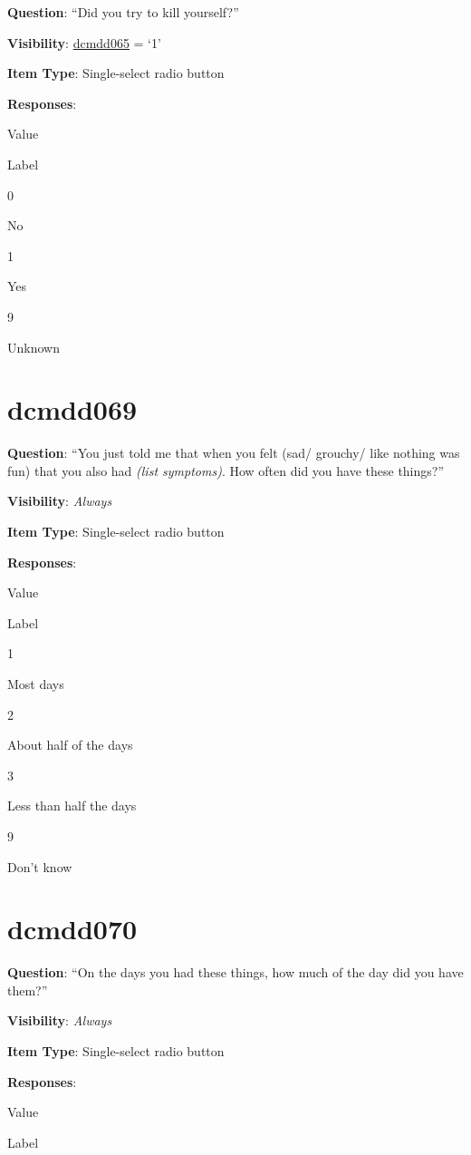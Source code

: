 \documentclass[]{book}
\begin{document}
\textbf{Question}: ``Did you try to kill yourself?''

\textbf{Visibility}: \protect\hyperlink{dcmdd065}{dcmdd065} = `1'

\textbf{Item Type}: Single-select radio button

\textbf{Responses}:

Value

Label

0

No

1

Yes

9

Unknown

\hypertarget{dcmdd069}{%
\section{dcmdd069}\label{dcmdd069}}

\textbf{Question}: ``You just told me that when you felt (sad/ grouchy/ like nothing was fun) that you also had \emph{(list symptoms)}. How often did you have these things?''

\textbf{Visibility}: \emph{Always}

\textbf{Item Type}: Single-select radio button

\textbf{Responses}:

Value

Label

1

Most days

2

About half of the days

3

Less than half the days

9

Don't know

\hypertarget{dcmdd070}{%
\section{dcmdd070}\label{dcmdd070}}

\textbf{Question}: ``On the days you had these things, how much of the day did you have them?''

\textbf{Visibility}: \emph{Always}

\textbf{Item Type}: Single-select radio button

\textbf{Responses}:

Value

Label
\end{document}
